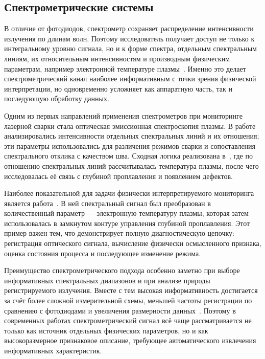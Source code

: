 \subsection{Спектрометрические системы}

В отличие от фотодиодов, спектрометр сохраняет распределение интенсивности излучения по длинам волн. Поэтому исследователь получает доступ не только к интегральному уровню сигнала, но и к форме спектра, отдельным спектральным линиям, их относительным интенсивностям и производным физическим параметрам, например электронной температуре плазмы~\cite{wu2022progress,huang2025laser,sebestova2012non}. Именно это делает спектрометрический канал наиболее информативным с точки зрения физической интерпретации, но одновременно усложняет как аппаратную часть, так и последующую обработку данных.

Одним из первых направлений применения спектрометров при мониторинге лазерной сварки стала оптическая эмиссионная спектроскопия плазмы. В работе~\cite{bruncko2003monitoring} анализировались интенсивности отдельных спектральных линий и их отношения; эти параметры использовались для различения режимов сварки и сопоставления спектрального отклика с качеством шва. Сходная логика реализована в~\cite{sebestova2012non}, где по отношению спектральных линий рассчитывалась температура плазмы, после чего исследовалась её связь с глубиной проплавления и появлением дефектов.

Наиболее показательной для задачи физически интерпретируемого мониторинга является работа~\cite{konuk2011closed}. В ней спектральный сигнал был преобразован в количественный параметр --- электронную температуру плазмы, которая затем использовалась в замкнутом контуре управления глубиной проплавления. Этот пример важен тем, что демонстрирует полную диагностическую цепочку: регистрация оптического сигнала, вычисление физически осмысленного признака, оценка состояния процесса и последующее изменение режима.

Преимущество спектрометрического подхода особенно заметно при выборе информативных спектральных диапазонов и при анализе природы регистрируемого излучения. Вместе с тем высокая информативность достигается за счёт более сложной измерительной схемы, меньшей частоты регистрации по сравнению с фотодиодами и увеличения размерности данных~\cite{wu2022progress, huang2025laser}. Поэтому в современных работах спектрометрический сигнал всё чаще рассматривается не только как источник отдельных физических параметров, но и как высокоразмерное признаковое описание, требующее автоматического
извлечения информативных характеристик.

